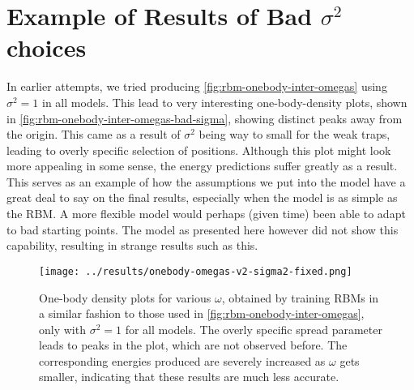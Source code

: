 \documentclass[a4paper, 11pt]{article}
\begin{document}
    \section{Example of Results of Bad $\sigma^2$ choices}
    In earlier attempts, we
    tried producing \autoref{fig:rbm-onebody-inter-omegas} using $\sigma^2=1$ in
    all models. This lead to very interesting one-body-density plots, shown in
    \autoref{fig:rbm-onebody-inter-omegas-bad-sigma}, showing
    distinct peaks away from the origin. This came as a result of $\sigma^2$
    being way to small for the weak traps, leading to overly specific selection
    of positions. Although this plot might look more appealing in some sense,
    the energy predictions suffer greatly as a result. This serves as an example
    of how the assumptions we put into the model have a great deal to say on the
    final results, especially when the model is as simple as the RBM. A more
    flexible model would perhaps (given time) been able to adapt to bad starting
    points. The model as presented here however did not show this capability,
    resulting in strange results such as this.
\begin{figure}[ht]
    \centering
    \texttt{[image: ../results/onebody-omegas-v2-sigma2-fixed.png]}
    \caption{One-body density plots for various $\omega$, obtained by training
    RBMs in a similar fashion to those used in
    \autoref{fig:rbm-onebody-inter-omegas}, only with $\sigma^2=1$ for all
    models. The overly specific spread parameter leads to peaks in the plot,
    which are not observed before. The corresponding energies produced are
    severely increased as $\omega$ gets smaller, indicating that these results
    are much less accurate.}
    \label{fig:rbm-onebody-inter-omegas-bad-sigma}
\end{figure}
\end{document}
